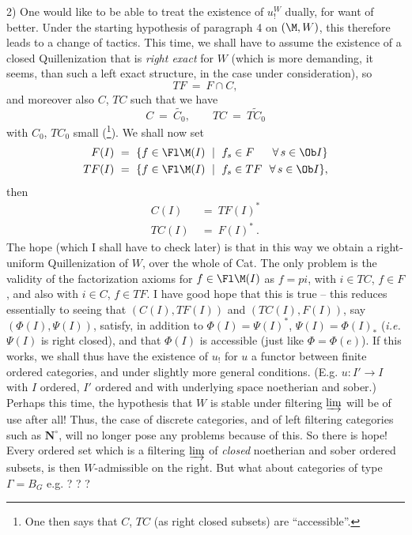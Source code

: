 2) One would like to be able to treat the existence of $u_!^W$ dually, for want of better. Under the starting hypothesis of paragraph 4 on $(\M,W)$, this therefore leads to a change of tactics. This time, we shall have to assume the existence of a closed Quillenization that is \textit{right exact} for $W$ (which is more demanding, it seems, than such a left exact structure, in the case under consideration), so
\[
TF \ = \ F \cap C,
\]
and moreover also $C$, $TC$ such that we have
\[
C \ = \ \widetilde{C_0}, \qquad TC \ = \ \widetilde{TC_0}
\]
with $C_0$, $TC_0$ small (\footnote[38]{One then says that $C$, $TC$ (as right closed subsets) are ``accessible''.}). We shall now set
\[
\begin{aligned}
F(I) \ &= \ \{f \in \Fl \M(I) \ \mid \ f_s \in F \quad\ \ \forall\, s \in \Ob I\}\\
TF(I) \ &= \ \{f \in \Fl \M(I) \ \mid \ f_s \in TF \ \ \forall\, s \in \Ob I\},
\end{aligned}
\]
then
\[
\begin{aligned}
C(I) \ &= \ TF(I)^*\\
TC(I) \ &= \ F(I)^*\ .
\end{aligned}
\]
The hope (which I shall have to check later) is that in this way we obtain a right-uniform Quillenization of $W$, over the whole of Cat. The only problem is the validity of the factorization axioms for $f \in \Fl \M(I)$ as $f = pi$, with $i \in TC$, $f \in F$, and also with $i \in C$, $f \in TF$. %
I have good hope that this is true -- this reduces essentially to seeing that $(C(I),TF(I))$ and $(TC(I),F(I))$, say $(\Phi(I),\Psi(I))$, satisfy, in addition to $\Phi(I) = \Psi(I)^*$, $\Psi(I) = \Phi(I)_*$ (\textit{i.e.} $\Psi(I)$ is right closed), and that $\Phi(I)$ is accessible (just like $\Phi = \Phi(e)$). If this works, we shall thus have the existence
of $u_!$ for $u$ a functor between finite ordered categories, and under slightly more general conditions. (E.g. $u : I' \longrightarrow I$ with $I$ ordered, $I'$ ordered and with underlying space noetherian and sober.) Perhaps this time, the hypothesis that $W$ is stable under filtering $\varinjlim$ will be of use after all! Thus, the case of discrete categories, and of left filtering categories such as $\mathbf{N}^\circ$, will no longer pose any problems because of this. So there is hope! Every ordered set which is a filtering $\varinjlim$ of \textit{closed} noetherian and sober ordered subsets, is then $W$-admissible on the right. But what about categories of type $\Gamma = B_G$ e.g. ? ? ?

